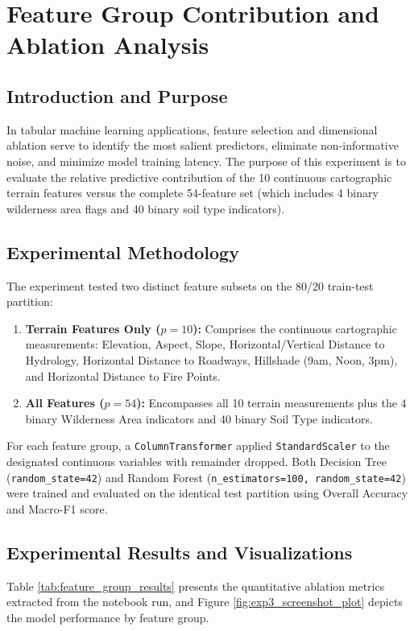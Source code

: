 \section{Feature Group Contribution and Ablation Analysis}
\label{sec:exp_feature_group}

\subsection{Introduction and Purpose}
In tabular machine learning applications, feature selection and dimensional ablation serve to identify the most salient predictors, eliminate non-informative noise, and minimize model training latency. The purpose of this experiment is to evaluate the relative predictive contribution of the 10 continuous cartographic terrain features versus the complete 54-feature set (which includes 4 binary wilderness area flags and 40 binary soil type indicators).

\subsection{Experimental Methodology}
The experiment tested two distinct feature subsets on the 80/20 train-test partition:
\begin{enumerate}
    \item \textbf{Terrain Features Only ($p=10$):} Comprises the continuous cartographic measurements: Elevation, Aspect, Slope, Horizontal/Vertical Distance to Hydrology, Horizontal Distance to Roadways, Hillshade (9am, Noon, 3pm), and Horizontal Distance to Fire Points.
    \item \textbf{All Features ($p=54$):} Encompasses all 10 terrain measurements plus the 4 binary Wilderness Area indicators and 40 binary Soil Type indicators.
\end{enumerate}
For each feature group, a \texttt{ColumnTransformer} applied \texttt{StandardScaler} to the designated continuous variables with remainder dropped. Both Decision Tree (\texttt{random\_state=42}) and Random Forest (\texttt{n\_estimators=100, random\_state=42}) were trained and evaluated on the identical test partition using Overall Accuracy and Macro-F1 score.

\subsection{Experimental Results and Visualizations}
Table \ref{tab:feature_group_results} presents the quantitative ablation metrics extracted from the notebook run, and Figure \ref{fig:exp3_screenshot_plot} depicts the model performance by feature group.

